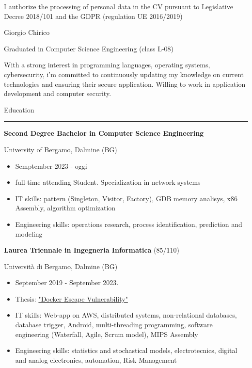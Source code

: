 \documentclass[a4paper]{letter}
\begin{document}
\hfill
\begin{minipage}[t]{0.65\textwidth}
\setlength{\baselineskip}{1.4\baselineskip}

{\tiny I authorize the processing of personal data in the CV pursuant to Legislative Decree 2018/101 and the GDPR (regulation UE 2016/2019)}
\vspace{0.3cm}


{\huge Giorgio Chirico}

{\large Graduated in Computer Science Engineering (class L-08)}

\vspace{0.5cm}
 
With a strong interest in programming languages, operating systems, cybersecurity, i'm committed to continuously updating my knowledge on current technologies and ensuring their secure application. Willing to work in application development and computer security. 


\vspace{0.5cm}

{\large Education}
\rule{\linewidth}{0.4pt}

{\large \textbf{Second Degree Bachelor in Computer Science Engineering}}

{\small University of Bergamo, Dalmine (BG)}
\begin{itemize}
    \item Semptember 2023 - oggi
    \item full-time attending Student. Specialization in network systems
    \item IT skills: pattern (Singleton, Visitor, Factory), GDB memory analisys, x86 Assembly, algorithm optimization
    \item Engineering skills: operations research, process identification, prediction and modeling 
\end{itemize}

{\large \textbf{Laurea Triennale in Ingegneria Informatica} \small (85/110)}

{\small Università di Bergamo, Dalmine (BG)}
\begin{itemize}
    \item September 2019 - September 2023.
    \item Thesis: \href{https://github.com/giorgio-hash/tesi-triennio}{"Docker Escape Vulnerability"}
    \item IT skills: Web-app on AWS, distributed systems, non-relational databases, database trigger, Android, multi-threading programming, software engineering (Waterfall, Agile, Scrum model), MIPS Assembly
    \item Engineering skills: statistics and stochastical models, electrotecnics, digital and analog electronics, automation, Risk Management
\end{itemize}


\end{minipage}
\end{document}
